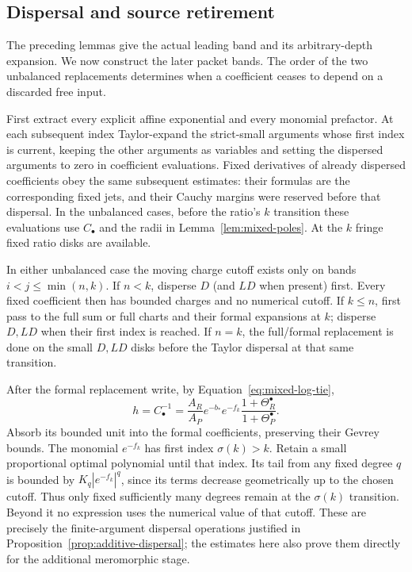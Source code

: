 \subsection{Dispersal and source retirement}

The preceding lemmas give the actual leading band and its
arbitrary-depth expansion. We now construct the later packet bands.
The order of the two unbalanced replacements determines when a
coefficient ceases to depend on a discarded free input.

First extract every explicit affine exponential and every
monomial prefactor. At each subsequent index Taylor-expand the
strict-small arguments whose first index is current, keeping the
other arguments as variables and setting the dispersed arguments
to zero in coefficient evaluations. Fixed derivatives of already
dispersed coefficients obey the same subsequent estimates:
their formulas are the corresponding fixed jets, and their
Cauchy margins were reserved before that dispersal. In the unbalanced
cases, before the ratio's $k$ transition these evaluations use
$C_\bullet$ and the radii in Lemma~\ref{lem:mixed-poles}. At the $k$
fringe fixed ratio disks are available.

In either unbalanced case the moving charge cutoff exists only
on bands $i<j\leq\min(n,k)$. If $n<k$, disperse $D$ (and $LD$
when present) first. Every fixed coefficient then has bounded
charges and no numerical cutoff. If $k\leq n$, first pass to the
full sum or full charts and their formal expansions at $k$;
disperse $D,LD$ when their first index is reached. If $n=k$, the
full/formal replacement is done on the small $D,LD$ disks before
the Taylor dispersal at that same transition.

After the formal replacement write, by
Equation~\eqref{eq:mixed-log-tie},
\[
 h=C_\bullet^{-1}
  =\frac{A_R}{A_P}e^{-b_*}e^{-f_k}
       \frac{1+\Theta_R^{\bullet}}{1+\Theta_P^{\bullet}}.
\]
Absorb its bounded unit into the formal coefficients, preserving
their Gevrey bounds. The monomial $e^{-f_k}$ has first index
$\sigma(k)>k$. Retain a small proportional optimal polynomial
until that index. Its tail from any fixed degree $q$ is bounded
by $K_q|e^{-f_k}|^q$, since its terms decrease geometrically up
to the chosen cutoff. Thus only fixed sufficiently many degrees
remain at the $\sigma(k)$ transition. Beyond it no expression
uses the numerical value of that cutoff. These are precisely the
finite-argument dispersal operations justified in
Proposition~\ref{prop:additive-dispersal}; the estimates here
also prove them directly for the additional meromorphic stage.

